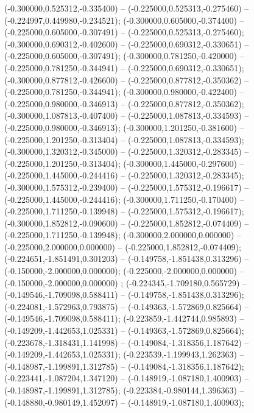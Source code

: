  (-0.300000,0.525312,-0.335400) -- (-0.225000,0.525313,-0.275460) -- (-0.224997,0.449980,-0.234521);
 (-0.300000,0.605000,-0.374400) -- (-0.225000,0.605000,-0.307491) -- (-0.225000,0.525313,-0.275460);
 (-0.300000,0.690312,-0.402600) -- (-0.225000,0.690312,-0.330651) -- (-0.225000,0.605000,-0.307491);
 (-0.300000,0.781250,-0.420000) -- (-0.225000,0.781250,-0.344941) -- (-0.225000,0.690312,-0.330651);
 (-0.300000,0.877812,-0.426600) -- (-0.225000,0.877812,-0.350362) -- (-0.225000,0.781250,-0.344941);
 (-0.300000,0.980000,-0.422400) -- (-0.225000,0.980000,-0.346913) -- (-0.225000,0.877812,-0.350362);
 (-0.300000,1.087813,-0.407400) -- (-0.225000,1.087813,-0.334593) -- (-0.225000,0.980000,-0.346913);
 (-0.300000,1.201250,-0.381600) -- (-0.225000,1.201250,-0.313404) -- (-0.225000,1.087813,-0.334593);
 (-0.300000,1.320312,-0.345000) -- (-0.225000,1.320312,-0.283345) -- (-0.225000,1.201250,-0.313404);
 (-0.300000,1.445000,-0.297600) -- (-0.225000,1.445000,-0.244416) -- (-0.225000,1.320312,-0.283345);
 (-0.300000,1.575312,-0.239400) -- (-0.225000,1.575312,-0.196617) -- (-0.225000,1.445000,-0.244416);
 (-0.300000,1.711250,-0.170400) -- (-0.225000,1.711250,-0.139948) -- (-0.225000,1.575312,-0.196617);
 (-0.300000,1.852812,-0.090600) -- (-0.225000,1.852812,-0.074409) -- (-0.225000,1.711250,-0.139948);
 (-0.300000,2.000000,0.000000) -- (-0.225000,2.000000,0.000000) -- (-0.225000,1.852812,-0.074409);
 (-0.224651,-1.851491,0.301203) -- (-0.149758,-1.851438,0.313296) -- (-0.150000,-2.000000,0.000000);
 (-0.225000,-2.000000,0.000000) -- (-0.150000,-2.000000,0.000000) ;
 (-0.224345,-1.709180,0.565729) -- (-0.149546,-1.709098,0.588411) -- (-0.149758,-1.851438,0.313296);
 (-0.224081,-1.572963,0.793875) -- (-0.149363,-1.572869,0.825664) -- (-0.149546,-1.709098,0.588411);
 (-0.223859,-1.442744,0.985893) -- (-0.149209,-1.442653,1.025331) -- (-0.149363,-1.572869,0.825664);
 (-0.223678,-1.318431,1.141998) -- (-0.149084,-1.318356,1.187642) -- (-0.149209,-1.442653,1.025331);
 (-0.223539,-1.199943,1.262363) -- (-0.148987,-1.199891,1.312785) -- (-0.149084,-1.318356,1.187642);
 (-0.223441,-1.087204,1.347120) -- (-0.148919,-1.087180,1.400903) -- (-0.148987,-1.199891,1.312785);
 (-0.223384,-0.980144,1.396363) -- (-0.148880,-0.980149,1.452097) -- (-0.148919,-1.087180,1.400903);
